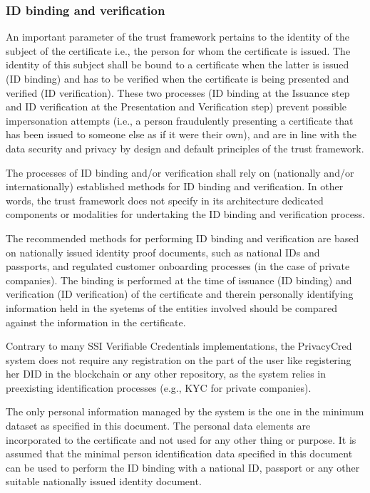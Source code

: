 \documentclass[a4paper,12pt,english]{sphinxhowto}
\begin{document}
\subsubsection{ID binding and verification}
\label{\detokenize{ssi/privacycred:id-binding-and-verification}}
\sphinxAtStartPar
An important parameter of the trust framework pertains to the identity of the subject of the certificate i.e., the person for whom the certificate is issued. The identity of this subject shall be bound to a certificate when the latter is issued (ID binding) and has to be verified when the certificate is being presented and verified (ID verification). These two processes (ID binding at the Issuance step and ID verification at the Presentation and Verification step) prevent possible impersonation attempts (i.e., a person fraudulently presenting a certificate that has been issued to someone else as if it were their own), and are in line with the data security and privacy by design and default principles of the trust framework.

\sphinxAtStartPar
The processes of ID binding and/or verification shall rely on (nationally and/or internationally) established methods for ID binding and verification. In other words, the trust framework does not specify in its architecture dedicated components or modalities for undertaking the ID binding and verification process.

\sphinxAtStartPar
The recommended methods for performing ID binding and verification are based on nationally issued identity proof documents, such as national IDs and passports, and regulated customer onboarding processes (in the case of private companies). The binding is performed at the time of issuance (ID binding) and verification (ID verification) of the certificate and therein personally identifying information held in the syetems of the entities involved should be compared against the information in the certificate.

\sphinxAtStartPar
Contrary to many SSI Verifiable Credentials implementations, the PrivacyCred system does not require any registration on the part of the user like registering her DID in the blockchain or any other repository, as the system relies in pre\sphinxhyphen{}existing identification processes (e.g., KYC for private companies).

\sphinxAtStartPar
The only personal information managed by the system is the one in the minimum dataset as specified
in this document. The personal data elements are incorporated to the certificate and not used for
any other thing or purpose. It is assumed that the minimal person identification data specified in
this document can be used to perform the ID binding with a national ID, passport or any other
suitable nationally issued identity document.
\end{document}

